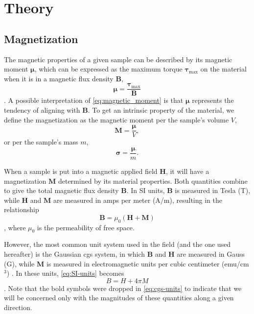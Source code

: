 \documentclass{../paper}
\begin{document}
\section{Theory}\label{sec:theory}

\subsection{Magnetization}

The magnetic properties of a given sample can be described by its magnetic moment $\boldsymbol \mu$, which can be expressed as the maximum torque $\boldsymbol \tau_\text{max}$ on the material when it is in a magnetic flux density $\boldsymbol B$,
\begin{equation}\label{eq:magnetic_moment}
  \boldsymbol \mu = \frac{\boldsymbol \tau_\text{max}}{\boldsymbol B}
\end{equation}
\cite{Jiles}. A possible interpretation of \eqref{eq:magnetic_moment} is that $\boldsymbol \mu$ represents the tendency of aligning with $\boldsymbol B$. To get an intrinsic property of the material, we define the magnetization as the magnetic moment per the sample's volume $V$,
\begin{equation}
  \boldsymbol M = \frac{\boldsymbol \mu}{V},
\end{equation}
or per the sample's mass $m$,
\begin{equation}
  \boldsymbol \sigma = \frac{\boldsymbol \mu}{m}.
\end{equation}

When a sample is put into a magnetic applied field $\boldsymbol H$, it will have a magnetization $\boldsymbol M$ determined by its material properties. Both quantities combine to give the total magnetic flux density $\boldsymbol B$. In SI units, $\boldsymbol B$ is measured in Tesla (T), while $\boldsymbol H$ and $\boldsymbol M$ are measured in amps per meter (A/m), resulting in the relationship
\begin{equation}\label{eq:SI-units}
  \boldsymbol B = \mu_0 (\boldsymbol H + \boldsymbol M)
\end{equation}
\cite{Jiles}, where $\mu_0$ is the permeability of free space.

However, the most common unit system used in the field (and the one used hereafter) is the Gaussian cgs system, in which $\boldsymbol B$ and $\boldsymbol H$ are measured in Gauss (G), while $\boldsymbol M$ is measured in electromagnetic units per cubic centimeter (emu/cm$^3$) \cite{QuantumDesign}. In these units, \eqref{eq:SI-units} becomes
\begin{equation}\label{eq:cgs-units}
  B = H + 4\pi M
\end{equation}
\cite{QuantumDesign}. Note that the bold symbols were dropped in \eqref{eq:cgs-units} to indicate that we will be concerned only with the magnitudes of these quantities along a given direction.
\end{document}
